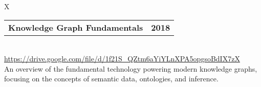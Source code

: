 \documentclass[10pt]{article}
\newcommand{\tabularxwidth}{\textwidth}
\begin{document}
        \begin{minipage}{\tabularxwidth}
        \begin{tabularx}{\tabularxwidth}{X}
            {
                \begin{tabularx}{\tabularxwidth}{@{}X r}
                    \textbf{Knowledge Graph Fundamentals} &
                    \textbf{
        2018} \\
                \end{tabularx}
            } \\

            

            
                \url{https://drive.google.com/file/d/1f21S_QZtm6aYiYLnXPA5opgsoBdIX7zX} \\
            
            

            
    An overview of the fundamental technology powering modern knowledge graphs, focusing on the concepts of semantic data, ontologies, and inference.
        \end{tabularx}
        
            \vspace{.5em}
        

        \end{minipage}
    
\end{document}
